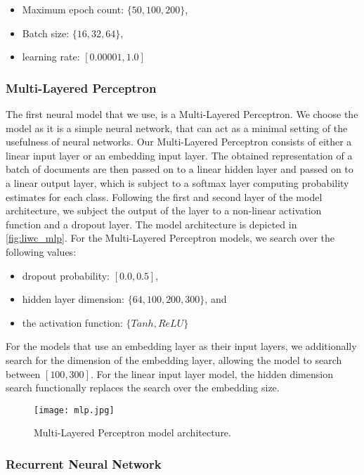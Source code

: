 \begin{itemize}
  \item Maximum epoch count: $\{50, 100, 200\}$,
  \item Batch size: $\{16, 32, 64\}$,
  \item learning rate: $[0.00001, 1.0]$
\end{itemize}

\subsubsection{Multi-Layered Perceptron}

The first neural model that we use, is a Multi-Layered Perceptron. We choose the model as it is a simple neural network, that can act as a minimal setting of the usefulness of neural networks. Our Multi-Layered Perceptron consists of either a linear input layer or an embedding input layer. The obtained representation of a batch of documents are then passed on to a linear hidden layer and passed on to a linear output layer, which is subject to a softmax layer computing probability estimates for each class. Following the first and second layer of the model architecture, we subject the output of the layer to a non-linear activation function and a dropout layer. The model architecture is depicted in \autoref{fig:liwc_mlp}. For the Multi-Layered Perceptron models, we search over the following values:

\begin{itemize}
  \item dropout probability: $[0.0, 0.5]$,
  \item hidden layer dimension: $\{64, 100, 200, 300\}$, and
  \item the activation function: $\{Tanh, ReLU\}$
\end{itemize}

For the models that use an embedding layer as their input layers, we additionally search for the dimension of the embedding layer, allowing the model to search between $[100, 300]$. For the linear input layer model, the hidden dimension search functionally replaces the search over the embedding size.

\begin{figure}
  \centering
  \texttt{[image: mlp.jpg]}
  \caption{Multi-Layered Perceptron model architecture.}
  \label{fig:liwc_mlp}
\end{figure}


\subsubsection{Recurrent Neural Network}

